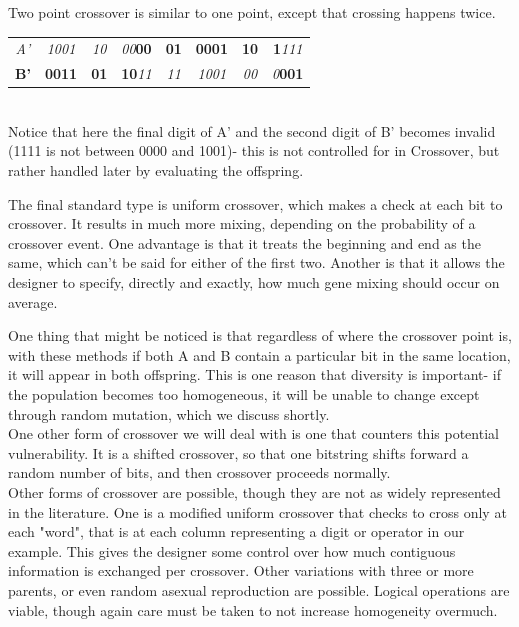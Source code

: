 Two point crossover is similar to one point, except that crossing happens twice.\\

\begin{tabular}{c|c|c|c|c|c|c|c|}
	\textit{A'} & \textit{1001} & \textit{10} & \textit{00}\textbf{00}  & \textbf{01} & \textbf{0001} & \textbf{10} & \textbf{1}\textit{111}\\ 
	\textbf{B'} & \textbf{0011} & \textbf{01} & \textbf{10}\textit{11} & \textit{11} & \textit{1001} & \textit{00} & \textit{0}\textbf{001}\\
	
\end{tabular}\\

Notice that here the final digit of A' and the second digit of B' becomes invalid (1111 is not between 0000 and 1001)- this is not controlled for in Crossover, but rather handled later by evaluating the offspring.

The final standard type is uniform crossover, which makes a check at each bit to crossover.  It results in much more mixing, depending on the probability of a crossover event.  One advantage is that it treats the beginning and end as the same, which can't be said for either of the first two.  Another is that it allows the designer to specify, directly and exactly, how much gene mixing should occur on average.

One thing that might be noticed is that regardless of where the crossover point is, with these methods if both A and B contain a particular bit in the same location, it will appear in both offspring.  This is one reason that diversity is important- if the population becomes too homogeneous, it will be unable to change except through random mutation, which we discuss shortly.\\
One other form of crossover we will deal with is one that counters this potential vulnerability.  It is a shifted crossover, so that one bitstring shifts forward a random number of bits, and then crossover proceeds normally.
\\
Other forms of crossover are possible, though they are not as widely represented in the literature.  One is a modified uniform crossover that checks to cross only  at each "word", that is at each column representing a digit or operator in our example.  This gives the designer some control over how much contiguous information is exchanged per crossover.  Other variations with three or more parents, or even random asexual reproduction are possible.  Logical operations are viable, though again care must be taken to not increase homogeneity overmuch. \\

